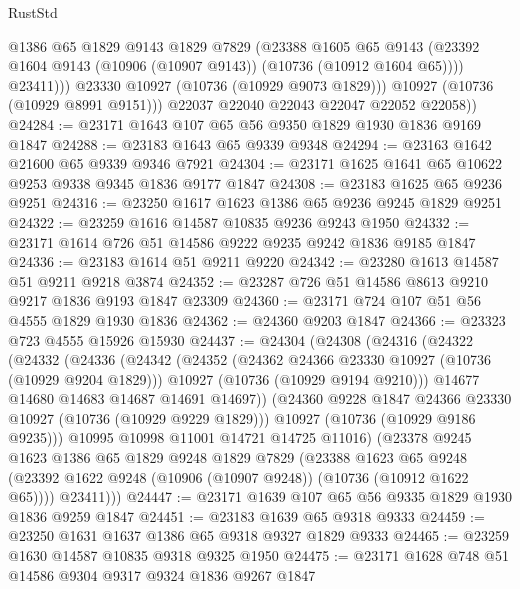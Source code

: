 \begin{lexlean}{RustStd}
\begin{coremodule}
                  @1386
                  @65
                  @1829
                  @9143
                  @1829
                  @7829
                  (@23388
                    @1605
                    @65
                    @9143
                    (@23392 @1604 @9143 (@10906 (@10907 @9143)) (@10736 (@10912 @1604 @65))))
                  @23411)))
            @23330
            @10927
            (@10736 (@10929 @9073 @1829)))
          @10927
          (@10736 (@10929 @8991 @9151)))
        @22037
        @22040
        @22043
        @22047
        @22052
        @22058))
@24284 := @23171 @1643 @107 @65 @56 @9350 @1829 @1930 @1836 @9169 @1847
@24288 := @23183 @1643 @65 @9339 @9348
@24294 := @23163 @1642 @21600 @65 @9339 @9346 @7921
@24304 := @23171 @1625 @1641 @65 @10622 @9253 @9338 @9345 @1836 @9177 @1847
@24308 := @23183 @1625 @65 @9236 @9251
@24316 := @23250 @1617 @1623 @1386 @65 @9236 @9245 @1829 @9251
@24322 := @23259 @1616 @14587 @10835 @9236 @9243 @1950
@24332 := @23171 @1614 @726 @51 @14586 @9222 @9235 @9242 @1836 @9185 @1847
@24336 := @23183 @1614 @51 @9211 @9220
@24342 := @23280 @1613 @14587 @51 @9211 @9218 @3874
@24352 := @23287 @726 @51 @14586 @8613 @9210 @9217 @1836 @9193 @1847 @23309
@24360 := @23171 @724 @107 @51 @56 @4555 @1829 @1930 @1836
@24362 := @24360 @9203 @1847
@24366 := @23323 @723 @4555 @15926 @15930
@24437 := @24304
    (@24308
      (@24316
        (@24322
          (@24332
            (@24336
              (@24342
                (@24352
                  (@24362 @24366 @23330 @10927 (@10736 (@10929 @9204 @1829)))
                  @10927
                  (@10736 (@10929 @9194 @9210)))
                @14677
                @14680
                @14683
                @14687
                @14691
                @14697))
            (@24360 @9228 @1847 @24366 @23330 @10927 (@10736 (@10929 @9229 @1829)))
            @10927
            (@10736 (@10929 @9186 @9235)))
          @10995
          @10998
          @11001
          @14721
          @14725
          @11016)
        (@23378
          @9245
          @1623
          @1386
          @65
          @1829
          @9248
          @1829
          @7829
          (@23388
            @1623
            @65
            @9248
            (@23392 @1622 @9248 (@10906 (@10907 @9248)) (@10736 (@10912 @1622 @65))))
          @23411)))
@24447 := @23171 @1639 @107 @65 @56 @9335 @1829 @1930 @1836 @9259 @1847
@24451 := @23183 @1639 @65 @9318 @9333
@24459 := @23250 @1631 @1637 @1386 @65 @9318 @9327 @1829 @9333
@24465 := @23259 @1630 @14587 @10835 @9318 @9325 @1950
@24475 := @23171 @1628 @748 @51 @14586 @9304 @9317 @9324 @1836 @9267 @1847

\end{coremodule}
\end{lexlean}
